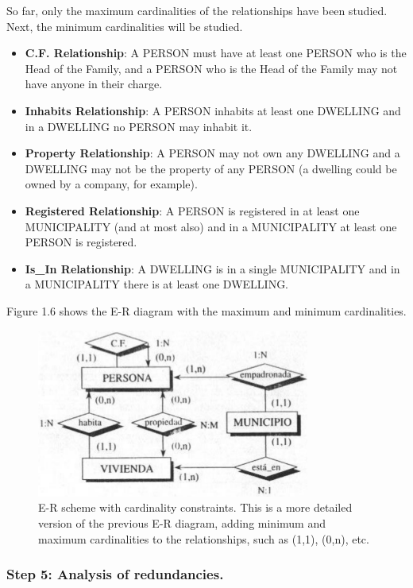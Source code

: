 \documentclass{article}
\begin{document}
So far, only the maximum cardinalities of the relationships have been studied.  Next, the minimum cardinalities will be studied.

\begin{itemize}
    \item \textbf{C.F. Relationship}: A PERSON must have at least one PERSON who is the Head of the Family, and a PERSON who is the Head of the Family may not have anyone in their charge.
    \item \textbf{Inhabits Relationship}: A PERSON inhabits at least one DWELLING and in a DWELLING no PERSON may inhabit it.
    \item \textbf{Property Relationship}: A PERSON may not own any DWELLING and a DWELLING may not be the property of any PERSON (a dwelling could be owned by a company, for example).
    \item \textbf{Registered Relationship}: A PERSON is registered in at least one MUNICIPALITY (and at most also) and in a MUNICIPALITY at least one PERSON is registered.
    \item \textbf{Is\_In Relationship}: A DWELLING is in a single MUNICIPALITY and in a MUNICIPALITY there is at least one DWELLING.
\end{itemize}

Figure 1.6 shows the E-R diagram with the maximum and minimum cardinalities.

\begin{figure}
    \centering
    \includegraphics[width=0.8\textwidth]{figures/fig6}
    \caption{E-R scheme with cardinality constraints. This is a more detailed version of the previous E-R diagram, adding minimum and maximum cardinalities to the relationships, such as (1,1), (0,n), etc.}
    \label{fig:fig1.6}
\end{figure}

\subsubsection*{Step 5: Analysis of redundancies.}
\end{document}
